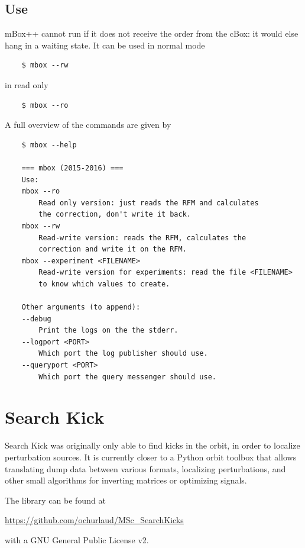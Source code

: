 \section{Use}
mBox++ cannot run if it does not receive the order from the cBox: it would else hang in a waiting state.
It can be used in normal mode
\begin{verbatim}
    $ mbox --rw
\end{verbatim}
in read only
\begin{verbatim}
    $ mbox --ro
\end{verbatim}
A full overview of the commands are given by
\begin{verbatim}
    $ mbox --help

    === mbox (2015-2016) ===
    Use:
    mbox --ro
        Read only version: just reads the RFM and calculates
        the correction, don't write it back.
    mbox --rw
        Read-write version: reads the RFM, calculates the
        correction and write it on the RFM.
    mbox --experiment <FILENAME>
        Read-write version for experiments: read the file <FILENAME>
        to know which values to create.
    
    Other arguments (to append):
    --debug
        Print the logs on the the stderr.
    --logport <PORT>
        Which port the log publisher should use.
    --queryport <PORT>
        Which port the query messenger should use.
\end{verbatim}

\chapter{Search Kick}
Search Kick was originally only able to find kicks in the orbit, in order to localize perturbation sources. It is currently closer to a Python orbit toolbox that allows translating dump data between various formats, localizing perturbations, and other small algorithms for inverting matrices or optimizing signals.

The library can be found at 
\begin{center}
        \url{https://github.com/ochurlaud/MSc_SearchKicks}
\end{center}
with a GNU General Public License v2.


    